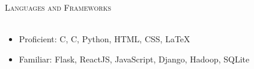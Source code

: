 \documentclass{article}
\newcommand{\lineunder}{\vspace*{-8pt} \\ \hspace*{-18pt} \hrulefill \\}
\newcommand{\header}[1]{{\hspace*{-15pt}\vspace*{6pt} \textsc{#1}} 
    \vspace*{-6pt} \lineunder}
\def\CC{{C\nolinebreak[4]\hspace{-.05em}\raisebox{.4ex}{\tiny\bf ++}}}
\begin{document}
   

    \header{Languages and Frameworks}
    \vspace*{-10pt}
    \setlength{\columnsep}{0in}
    \begin{multicols}{2}
      \begin{itemize}
        \item Proficient: \CC, C, Python, HTML, CSS, \LaTeX
        \item Familiar: Flask, ReactJS, JavaScript, Django, Hadoop, SQLite
      \end{itemize}
    \end{multicols}
    
    \vspace*{-10pt}
    
   
    
    
    

    
    
    
\end{document}
